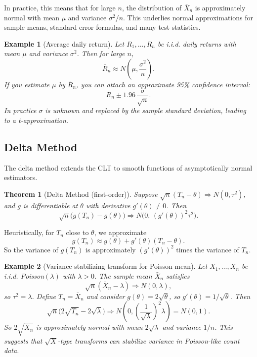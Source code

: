 \documentclass[11pt,a4paper]{article}
\newtheorem{theorem}{Theorem}[section]
\newtheorem{example}{Example}[section]
\begin{document}
In practice, this means that for large $n$, the distribution of $\bar{X}_n$ is approximately normal with mean $\mu$ and variance $\sigma^2/n$. 
This underlies normal approximations for sample means, standard error formulas, and many test statistics.

\begin{example}[Average daily return]
Let $R_1,\dots,R_n$ be i.i.d. daily returns with mean $\mu$ and variance $\sigma^2$. 
Then for large $n$,
\[
\bar{R}_n \approx N\left(\mu,\frac{\sigma^2}{n}\right).
\]
If you estimate $\mu$ by $\bar{R}_n$, you can attach an approximate 95\% confidence interval:
\[
\bar{R}_n \pm 1.96\,\frac{\sigma}{\sqrt{n}}.
\]
In practice $\sigma$ is unknown and replaced by the sample standard deviation, leading to a t-approximation.

\end{example}

\subsection{Delta Method}

The delta method extends the CLT to smooth functions of asymptotically normal estimators.

\begin{theorem}[Delta Method (first-order)]
Suppose $\sqrt{n}(T_n - \theta) \Rightarrow N(0,\tau^2)$, and $g$ is differentiable at $\theta$ with derivative $g'(\theta) \ne 0$. 
Then
\[
\sqrt{n}\big(g(T_n) - g(\theta)\big) \Rightarrow N\big(0,\,(g'(\theta))^2 \tau^2\big).
\]
\end{theorem}

Heuristically, for $T_n$ close to $\theta$, we approximate
\[
g(T_n) \approx g(\theta) + g'(\theta)(T_n - \theta).
\]
So the variance of $g(T_n)$ is approximately $(g'(\theta))^2$ times the variance of $T_n$.

\begin{example}[Variance-stabilizing transform for Poisson mean]
Let $X_1,\dots,X_n$ be i.i.d. Poisson$(\lambda)$ with $\lambda>0$. 
The sample mean $\bar{X}_n$ satisfies
\[
\sqrt{n}(\bar{X}_n - \lambda) \Rightarrow N(0,\lambda),
\]
so $\tau^2 = \lambda$. 
Define $T_n = \bar{X}_n$ and consider $g(\theta) = 2\sqrt{\theta}$, so $g'(\theta) = 1/\sqrt{\theta}$. 
Then
\[
\sqrt{n}\big(2\sqrt{T_n} - 2\sqrt{\lambda}\big)
\Rightarrow N\left(0, \left(\frac{1}{\sqrt{\lambda}}\right)^2 \lambda\right)
= N(0,1).
\]
So $2\sqrt{\bar{X}_n}$ is approximately normal with mean $2\sqrt{\lambda}$ and variance $1/n$. 
This suggests that $\sqrt{X}$-type transforms can stabilize variance in Poisson-like count data.

\end{example}
\end{document}
